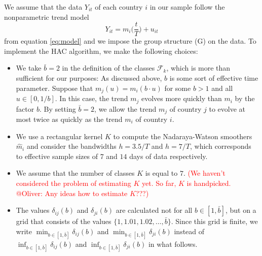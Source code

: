 \documentclass[a4paper,12pt]{article}
\numberwithin{equation}{section}
\begin{document}
We assume that the data $Y_{it}$ of each country $i$ in our sample follow the nonparametric trend model 
\[ Y_{it} = m_i\Big(\frac{t}{T}\Big) + u_{it} \]
from equation \eqref{eq:model} and we impose the group structure (G) on the data. 
To implement the HAC algorithm, we make the following choices:
\begin{itemize}[leftmargin=0.6cm]
\item We take $\bar{b} = 2$ in the definition of the classes $\mathcal{F}_k$, which is more than sufficient for our purposes: As discussed above, $b$ is some sort of effective time parameter. Suppose that $m_j(u) = m_i(b \cdot u)$ for some $b > 1$ and all $u \in [0,1/b]$. In this case, the trend $m_j$ evolves more quickly than $m_i$ by the factor $b$. By setting $\bar{b} = 2$, we allow the trend $m_j$ of country $j$ to evolve at most twice as quickly as the trend $m_i$ of country $i$.  
\item We use a rectangular kernel $K$ to compute the Nadaraya-Watson smoothers $\hat{m}_{i}$ and consider the bandwidths $h = 3.5/T$ and $h = 7/T$, which corresponds to effective sample sizes of $7$ and $14$ days of data respectively. 
\item We assume that the number of classes $K$ is equal to $7$. \textcolor{red}{(We haven't considered the problem of estimating $K$ yet. So far, $K$ is handpicked. @Oliver: Any ideas how to estimate $K$???)}
\item The values $\delta_{ij}(b)$ and $\delta_{ji}(b)$ are calculated not for all $b\in [1, \bar{b}]$, but on a grid that consists of the values $\{1, 1.01, 1.02, \ldots, \bar{b}\}$. Since this grid is finite, we write $\min_{b \in [1, \bar{b}]} \delta_{ij}(b)$ and $\min_{b \in [1, \bar{b}]} \delta_{ji}(b)$ instead of $\inf_{b \in [1, \bar{b}]} \delta_{ij}(b)$ and $\inf_{b \in [1, \bar{b}]} \delta_{ji}(b)$ in what follows.
\end{itemize}
\end{document}
